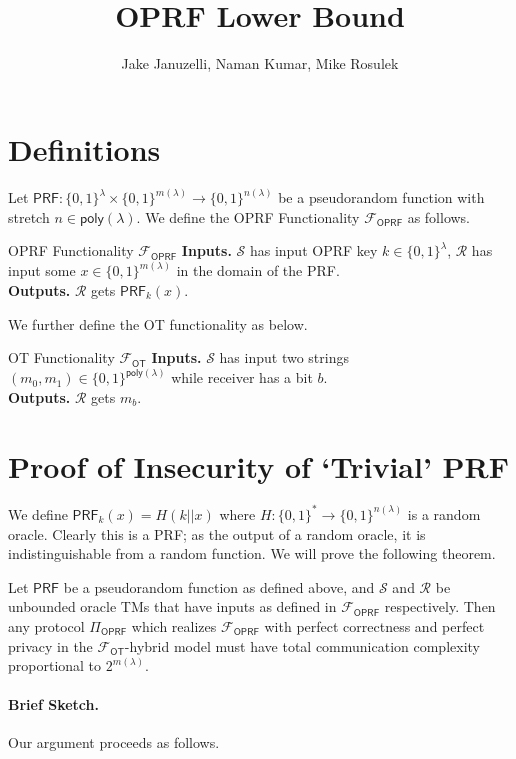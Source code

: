 \documentclass[10pt,a4paper]{article}
\title{\textbf{OPRF Lower Bound}}
\author{Jake Januzelli, Naman Kumar, Mike Rosulek}
\newcommand{\F}{\mathcal{F}}
\newcommand{\poly}{\mathsf{poly}}
\newcommand{\oprf}{\mathsf{OPRF}}
\newcommand{\prf}{\mathsf{PRF}}
\newcommand{\bin}{\{0,1\}}
\newcommand{\secpar}{\lambda}
\newcommand{\sender}{\mathcal{S}}
\newcommand{\receiver}{\mathcal{R}}
\newcommand{\ot}{\mathsf{OT}}
\begin{document}
	\maketitle

\section{Definitions}

Let $\prf:\bin^\secpar\times\bin^{m(\secpar)}\rightarrow\bin^{n(\secpar)}$ be a pseudorandom function with stretch $n\in\poly(\secpar)$. We define the OPRF Functionality $\F_\oprf$ as follows.

\begin{funcbox}{OPRF Functionality $\F_\oprf$}{}{}
	\textbf{Inputs.} $\sender$ has input OPRF key $k\in\bin^\secpar$, $\receiver$ has input some $x\in\bin^{m(\secpar)}$ in the domain of the PRF.\\
	\textbf{Outputs.} $\receiver$ gets $\prf_k(x)$.
\end{funcbox}

We further define the OT functionality as below.

\begin{funcbox}{OT Functionality $\F_\ot$}{}{}
	\textbf{Inputs.} $\sender$ has input two strings $(m_0, m_1)\in\bin^{\poly(\secpar)}$ while receiver has a bit $b$.\\
	\textbf{Outputs.} $\receiver$ gets $m_b$.
\end{funcbox}

\section{Proof of Insecurity of `Trivial' PRF}
We define $\prf_k(x) = H(k || x)$ where $H:\bin^{*}\rightarrow\bin^{n(\secpar)}$ is a random oracle. Clearly this is a PRF; as the output of a random oracle, it is indistinguishable from a random function. We will prove the following theorem.

\begin{theorem}
	Let $\prf$ be a pseudorandom function as defined above, and $\sender$ and $\receiver$ be unbounded oracle TMs that have inputs as defined in $\F_\oprf$ respectively. Then any protocol $\Pi_\oprf$ which realizes $\F_\oprf$ with perfect correctness and perfect privacy in the $\F_\ot$-hybrid model must have total communication complexity proportional to $2^{m(\secpar)}$.
\end{theorem}

\paragraph{Brief Sketch.} Our argument proceeds as follows. 


%	
%	
	
\end{document}
